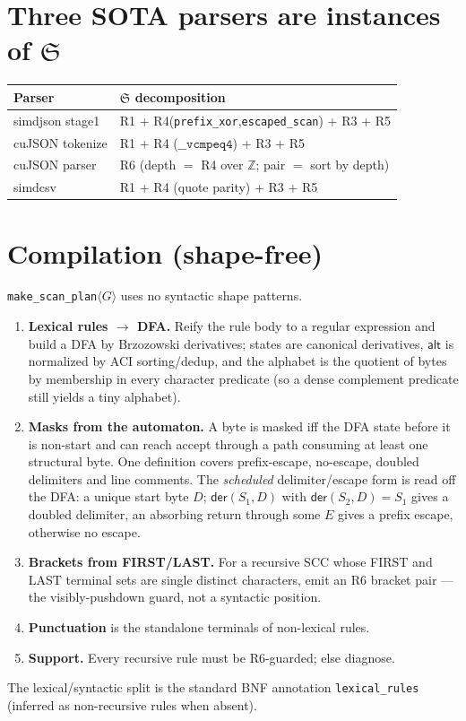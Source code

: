 \documentclass[11pt]{article}
\begin{document}
\section{Three SOTA parsers are instances of $\mathfrak{S}$}
\begin{center}
\begin{tabular}{@{}ll@{}}
\toprule
Parser & $\mathfrak{S}$ decomposition\\
\midrule
simdjson stage1 & R1 + R4(\texttt{prefix\_xor},\texttt{escaped\_scan}) + R3 + R5\\
cuJSON tokenize & R1 + R4 ($\texttt{\_\_vcmpeq4}$) + R3 + R5\\
cuJSON parser & R6 (depth $=$ R4 over $\mathbb Z$; pair $=$ sort by depth)\\
simdcsv & R1 + R4 (quote parity) + R3 + R5\\
\bottomrule
\end{tabular}
\end{center}

\section{Compilation (shape-free)}
\texttt{make\_scan\_plan}$\langle G\rangle$ uses no syntactic shape patterns.
\begin{enumerate}
\item \textbf{Lexical rules $\to$ DFA.}  Reify the rule body to a regular
expression and build a DFA by Brzozowski derivatives; states are canonical
derivatives, $\mathsf{alt}$ is normalized by ACI sorting/dedup, and the alphabet
is the quotient of bytes by membership in every character predicate (so a dense
complement predicate still yields a tiny alphabet).
\item \textbf{Masks from the automaton.}  A byte is masked iff the DFA state
before it is non-start and can reach accept through a path consuming at least
one structural byte.  One definition covers prefix-escape, no-escape, doubled
delimiters and line comments.  The \emph{scheduled} delimiter/escape form is read
off the DFA: a unique start byte $D$; $\mathsf{der}(S_1,D)$ with
$\mathsf{der}(S_2,D)=S_1$ gives a doubled delimiter, an absorbing return through
some $E$ gives a prefix escape, otherwise no escape.
\item \textbf{Brackets from FIRST/LAST.}  For a recursive SCC whose FIRST and
LAST terminal sets are single distinct characters, emit an R6 bracket pair ---
the visibly-pushdown guard, not a syntactic position.
\item \textbf{Punctuation} is the standalone terminals of non-lexical rules.
\item \textbf{Support.}  Every recursive rule must be R6-guarded; else diagnose.
\end{enumerate}
The lexical/syntactic split is the standard BNF annotation \texttt{lexical\_rules}
(inferred as non-recursive rules when absent).
\end{document}

